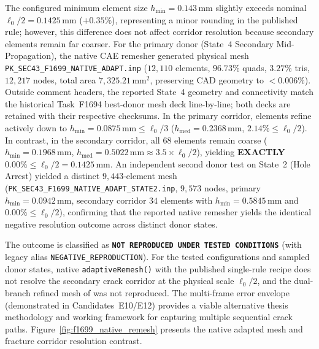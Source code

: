 \begin{enumerate}
  The configured minimum element size $h_{\min} = 0.143\,\mathrm{mm}$ slightly exceeds nominal $\ell_0/2 = 0.1425\,\mathrm{mm}$ ($+0.35\%$), representing a minor rounding in the published rule; however, this difference does not affect corridor resolution because secondary elements remain far coarser.
  For the primary donor (State~4 Secondary Mid-Propagation), the native CAE remesher generated physical mesh \texttt{PK\_SEC43\_F1699\_NATIVE\_ADAPT.inp} ($12{,}110$ elements, $96.73\%$ quads, $3.27\%$ tris, $12{,}217$ nodes, total area $7{,}325.21\,\mathrm{mm}^2$, preserving CAD geometry to $< 0.006\%$). Outside comment headers, the reported State~4 geometry and connectivity match the historical Task~F1694 best-donor mesh deck line-by-line; both decks are retained with their respective checksums. In the primary corridor, elements refine actively down to $h_{\min} = 0.0875\,\mathrm{mm} \le \ell_0/3$ ($h_{\mathrm{med}} = 0.2368\,\mathrm{mm}$, $2.14\% \le \ell_0/2$). In contrast, in the secondary corridor, all $68$ elements remain coarse ($h_{\min} = 0.1968\,\mathrm{mm}$, $h_{\mathrm{med}} = 0.5022\,\mathrm{mm} \approx 3.5 \times \ell_0/2$), yielding \textbf{EXACTLY $\mathbf{0.00\%} \le \ell_0/2 = 0.1425\,\mathrm{mm}$}.
  An independent second donor test on State~2 (Hole Arrest) yielded a distinct $9{,}443$-element mesh (\texttt{PK\_SEC43\_F1699\_NATIVE\_ADAPT\_STATE2.inp}, $9{,}573$ nodes, primary $h_{\min} = 0.0942\,\mathrm{mm}$, secondary corridor $34$ elements with $h_{\min} = 0.5845\,\mathrm{mm}$ and $\mathbf{0.00\%} \le \ell_0/2$), confirming that the reported native remesher yields the identical negative resolution outcome across distinct donor states.
\end{enumerate}
The outcome is classified as \textbf{\texttt{NOT REPRODUCED UNDER TESTED CONDITIONS}} (with legacy alias \texttt{NEGATIVE\_REPRODUCTION}). For the tested configurations and sampled donor states, native \Abaqus \texttt{adaptiveRemesh()} with the published single-rule recipe does not resolve the secondary crack corridor at the physical scale $\ell_0/2$, and the dual-branch refined mesh of \citet[Fig.~16b]{pandey2025} was not reproduced. The multi-frame error envelope (demonstrated in Candidates~E10/E12) provides a viable alternative thesis methodology and working framework for capturing multiple sequential crack paths. Figure~\ref{fig:f1699_native_remesh} presents the native adapted mesh and fracture corridor resolution contrast.

